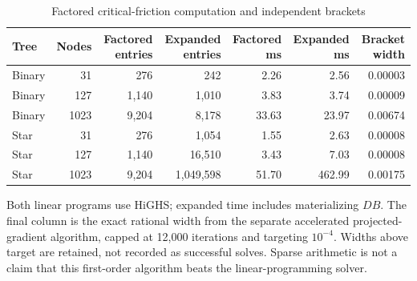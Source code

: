 \begin{table}[t]
\centering\small
\caption{Factored critical-friction computation and independent brackets}\label{tab:r13-scaling}
\begin{tabular}{lrrrrrr}\toprule
Tree & Nodes & Factored entries & Expanded entries & Factored ms & Expanded ms & Bracket width \\\midrule
Binary & 31 & 276 & 242 & 2.26 & 2.56 & 0.00003 \\
Binary & 127 & 1,140 & 1,010 & 3.83 & 3.74 & 0.00009 \\
Binary & 1023 & 9,204 & 8,178 & 33.63 & 23.97 & 0.00674 \\
Star & 31 & 276 & 1,054 & 1.55 & 2.63 & 0.00008 \\
Star & 127 & 1,140 & 16,510 & 3.43 & 7.03 & 0.00008 \\
Star & 1023 & 9,204 & 1,049,598 & 51.70 & 462.99 & 0.00175 \\
\bottomrule\end{tabular}
\par\smallskip\begin{minipage}{.96\textwidth}\footnotesize Both linear programs use HiGHS; expanded time includes materializing $DB$. The final column is the exact rational width from the separate accelerated projected-gradient algorithm, capped at 12,000 iterations and targeting $10^{-4}$. Widths above target are retained, not recorded as successful solves. Sparse arithmetic is not a claim that this first-order algorithm beats the linear-programming solver.\end{minipage}
\end{table}
